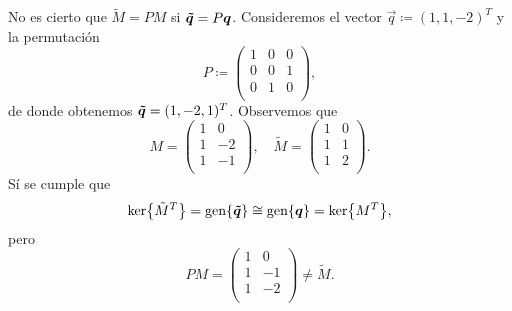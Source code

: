 \begin{observation}
	No es cierto que $\tilde{M} = PM$ si $\boldsymbol{\tilde{q}} = P\boldsymbol{q}$. Consideremos el vector
	$\vec{q} \coloneq (1, 1, -2)^T$ y la permutación
	\begin{equation*}
		P \coloneq \begin{pmatrix}
			1 & 0 & 0 \\
			0 & 0 & 1 \\
			0 & 1 & 0 \\
		\end{pmatrix},
	\end{equation*}
	de donde obtenemos $\boldsymbol{\tilde{q}} = (1, -2, 1)^T$. Observemos que
	\begin{equation*}
		M = \begin{pmatrix}
			1 & 0 \\
			1 & -2 \\
			1 & -1 \\
		\end{pmatrix}, \quad
		\tilde{M} = \begin{pmatrix}
			1 & 0 \\
			1 & 1 \\
			1 & 2 \\
		\end{pmatrix}.
	\end{equation*}
	Sí se cumple que
	\begin{equation*}
		\mathop{\mathrm{ker}{\left\lbrace \tilde{M}^T \right\rbrace}} = \operatorname{gen}\lbrace \boldsymbol{\tilde{q}} \rbrace
		\cong \operatorname{gen}\lbrace \boldsymbol{q} \rbrace = \mathop{\mathrm{ker}{\left\lbrace M^T \right\rbrace}},
	\end{equation*}
	pero
	\begin{equation*}
		PM = \begin{pmatrix}
			1 & 0 \\
			1 & -1 \\
			1 & -2 \\
		\end{pmatrix}
		\neq \tilde{M}.
	\end{equation*}
\end{observation}

